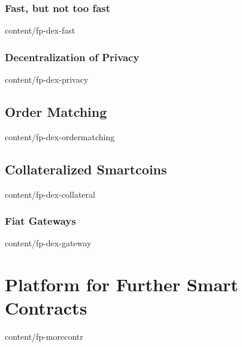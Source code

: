 \documentclass{btswhitepaper}
\begin{document}
\subsubsection  { Fast, but not too fast                           }  { content/fp-dex-fast            } 
\subsubsection  { Decentralization of Privacy                      }  { content/fp-dex-privacy         } 
\subsection     { Order Matching                                   }  { content/fp-dex-ordermatching   } 
\subsection     { Collateralized Smartcoins                        }  { content/fp-dex-collateral      } 
\subsubsection  { Fiat Gateways                                    }  { content/fp-dex-gateway         } 

\section        { Platform for Further Smart Contracts             }  { content/fp-morecontr           }
\end{document}
